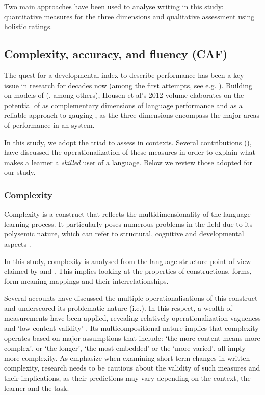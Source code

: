 \documentclass[output=paper]{langsci/langscibook}
\begin{document}
Two main approaches have been used to analyse writing in this study: quantitative measures for the three  dimensions and qualitative assessment using holistic ratings.

\subsection{Complexity, accuracy, and fluency (CAF)}

The quest for a developmental index to describe  performance has been a key issue in  research for decades now (among the first attempts, see e.g. \citealt{Larsen-Freeman1978}). Building on  models of   (\citealt{Skehan2009,EllisBarkhuizen2005}, among others), Housen et al’s 2012 volume elaborates on the potential of  as complementary dimensions of language performance and as a reliable approach to gauging  , as the three dimensions encompass the major areas of performance in an  system. 

In this study, we adopt the  triad to assess  in  contexts. Several contributions (\citealt{BultéHousen2014,HousenKuiken2009,HousenEtAl2012,Wolfe-QuinteroEtAl1998}), have discussed the operationalization of these measures in order to explain what makes a learner a \textit{skilled} user of a language. Below we review those adopted for our study.  

\subsubsection{Complexity}

Complexity is a construct that reflects the multidimensionality of the language learning process. It particularly poses numerous problems in the  field due to its polysemic nature, which can refer to structural, cognitive and developmental aspects \citep{Pallotti2015}.

In this study,  complexity is analysed from the language structure point of view claimed by \citet{HousenEtAl2012} and \citet{Pallotti2015}. This implies looking at the properties of  constructions, forms,  form-meaning mappings and their interrelationships.  

Several accounts have discussed the multiple operationalisations of this construct and underscored its problematic nature (i.e.\citealt{Wolfe-QuinteroEtAl1998,NorrisOrtega2009,Pallotti2015,HousenEtAl2012,Skehan2009}). In this respect, a wealth of measurements have been applied, revealing relatively operationalization vagueness and ‘low content validity’ \citep[47]{BultéHousen2014}. Its multicompositional nature implies that complexity operates based on major assumptions that include: ‘the more content means more complex’, or ‘the longer’, ‘the most embedded’ or the ‘more varied’, all imply more complexity. As \citet{BultéHousen2014} emphasize when examining short-term changes in written complexity,  research needs to be cautious about the validity of such measures and their implications, as their predictions may vary depending on the context, the learner and the task. 
\end{document}
